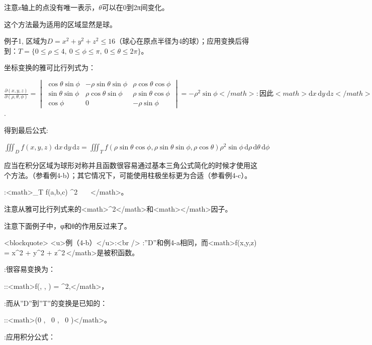 \documentclass[UTF-8]{ctexart}
\begin{document}
注意z轴上的点没有唯一表示，$\theta$可以在0到2π间变化。

这个方法最为适用的区域显然是球。

例子1,
区域为$D = x^2 + y^2 + z^2 \le 16$（球心在原点半径为4的球）；应用变换后得到：$T = \{ 0 \le \rho \le 4, \ 0 \le \phi \le \pi, \ 0 \le \theta \le 2 \pi \}$。

坐标变换的雅可比行列式为：

$\frac{\partial (x,y,z)}{\partial (\rho, \theta, \phi)} =
\begin{vmatrix}
\cos \theta \sin \phi & - \rho \sin \theta \sin \phi & \rho \cos \theta \cos \phi \\
\sin \theta \sin \phi & \rho \cos \theta \sin \phi & \rho \sin \theta \cos \phi \\
\cos \phi & 0 & - \rho \sin \phi
\end{vmatrix} = -\rho^2 \sin \phi</math>

:因此<math> \mathrm{d}x\, \mathrm{d}y\, \mathrm{d}z </math>变换为<math> \rho^2 \sin \phi \, \mathrm{d}\rho\, \mathrm{d}\theta\, \mathrm{d}\phi$.

得到最后公式:

$\iiint_D f(x,y,z) \, \mathrm{d}x\, \mathrm{d}y\, \mathrm{d}z = \iiint_T f(\rho \sin \theta \cos \phi, \rho \sin \theta \sin \phi, \rho \cos \theta) \rho^2 \sin \phi \, \mathrm{d}\rho\, \mathrm{d}\theta\, \mathrm{d}\phi$

应当在积分区域为球形对称并且函数很容易通过基本三角公式简化的时候才使用这个方法。（参看例4-b）；其它情况下，可能使用柱极坐标更为合适（参看例4-c）。

:<math>\iiint_T f(a,b,c) \rho^2 \sin \phi \, \rho\, \theta\, \phi</math>。

注意从雅可比行列式来的<math>\rho^2</math>和<math>\sin \phi</math>因子。

注意下面例子中，φ和θ的作用反过来了。

<blockquote>
<u>例（4-b）</u>:<br />
:''D''和例4-a相同，而<math>f(x,y,z) = x^2 + y^2 + z^2\,\!</math>是被积函数。

:很容易变换为：

::<math>f(\rho \sin \theta \cos \phi, \rho \sin \theta \sin \phi, \rho \cos \theta) = \rho^2,</math>，

:而从''D''到''T''的变换是已知的：

::<math>(0 \le \rho {}, \ 0 \le \phi {} \pi, \ 0 \le \theta \le \pi)</math>。

:应用积分公式：
\end{document}
